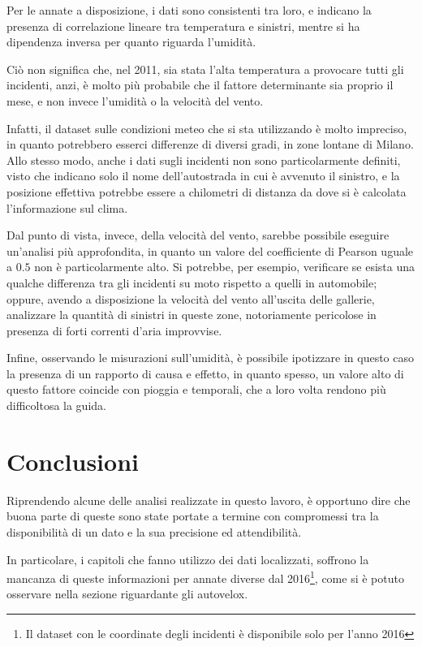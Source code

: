 \documentclass[a4paper,12pt]{report}
\begin{document}
Per le annate a disposizione, i dati sono consistenti tra loro, e indicano la presenza di 
correlazione lineare tra temperatura e sinistri, mentre si ha dipendenza inversa per quanto 
riguarda l'umidità. 

Ciò non significa che, nel 2011, sia stata l'alta temperatura a provocare 
tutti gli incidenti, anzi, è molto più probabile che il fattore determinante 
sia proprio il mese, e non invece l'umidità o la velocità del vento. 

Infatti, il dataset sulle condizioni meteo che si sta utilizzando è molto impreciso, 
in quanto potrebbero esserci differenze di diversi gradi, in zone lontane di Milano. 
Allo stesso modo, anche i dati sugli incidenti non sono particolarmente definiti, 
visto che indicano solo il nome dell'autostrada in cui è avvenuto 
il sinistro, e la posizione effettiva potrebbe essere a chilometri di distanza da dove 
si è calcolata l'informazione sul clima. 

Dal punto di vista, invece, della velocità del vento, sarebbe possibile eseguire 
un'analisi più approfondita, in quanto un valore del coefficiente di Pearson uguale 
a $0.5$ non è particolarmente alto. 
Si potrebbe, per esempio, verificare se esista una qualche differenza tra gli 
incidenti su moto rispetto a quelli in automobile; 
oppure, avendo a disposizione la velocità del vento all'uscita delle gallerie, 
analizzare la quantità di sinistri in queste zone, notoriamente pericolose 
in presenza di forti correnti d'aria improvvise. 

Infine, osservando le misurazioni sull'umidità, è possibile ipotizzare 
in questo caso la presenza di un rapporto di causa e effetto, 
in quanto spesso, un valore alto di questo fattore 
coincide con pioggia e temporali, che a loro volta rendono più difficoltosa la guida. 

\chapter{Conclusioni}

Riprendendo alcune delle analisi realizzate in questo lavoro, è opportuno dire che buona 
parte di queste sono state portate a termine con compromessi 
tra la disponibilità di un dato e la sua precisione ed attendibilità.

In particolare, i capitoli che fanno utilizzo dei dati localizzati, soffrono la mancanza di 
queste informazioni per annate diverse dal 
2016\footnote{Il dataset con le coordinate degli incidenti è disponibile solo per l'anno 2016}, 
come si è potuto osservare nella sezione riguardante gli autovelox. 
\end{document}
